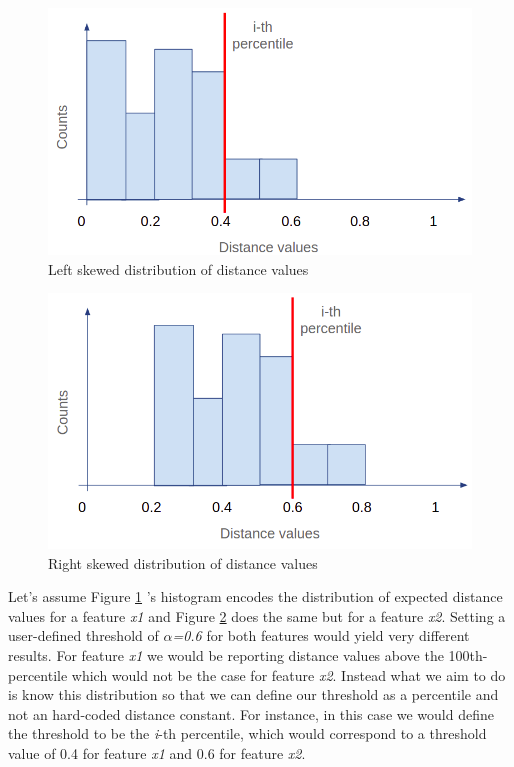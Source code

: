 \begin{figure}[!htb]
    \begin{center}
      \includegraphics[scale=0.4]{figures/skewed-left-distro.png}
      \caption[]{Left skewed distribution of distance values}
      \label{fig:skewed-left-distro}
    \end{center}
\end{figure}

\begin{figure}[!htb]
    \begin{center}
      \includegraphics[scale=0.4]{figures/skewed-right-distro.png}
      \caption[]{Right skewed distribution of distance values}
      \label{fig:skewed-right-distro}
    \end{center}
\end{figure}

Let's assume Figure \ref{fig:skewed-left-distro} 's histogram encodes the distribution of expected distance values for a feature \textit{x1} and Figure \ref{fig:skewed-right-distro} does the same but for a feature \textit{x2}. Setting a user-defined threshold of \textit{$\alpha$=0.6} for both features would yield very different results. For feature \textit{x1} we would be reporting distance values above the 100th-percentile which would not be the case for feature \textit{x2}. Instead what we aim to do is know this distribution so that we can define our threshold as a percentile and not an hard-coded distance constant. For instance, in this case we would define the threshold to be the \textit{i}-th percentile, which would correspond to a threshold value of 0.4 for feature \textit{x1} and 0.6 for feature \textit{x2}.

